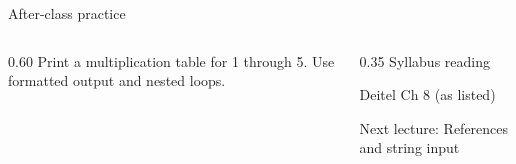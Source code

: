 \documentclass[10pt,aspectratio=169]{beamer}
\begin{document}
\begin{frame}[fragile,t]{After-class practice}
\begin{columns}[T,onlytextwidth]\begin{column}{0.60\textwidth}
Print a multiplication table for 1 through 5. Use formatted output and nested loops.
\end{column}\begin{column}{0.35\textwidth}\small
Syllabus reading\par Deitel Ch 8 (as listed)

Next lecture: References and string input
\end{column}\end{columns}
\end{frame}
\end{document}
